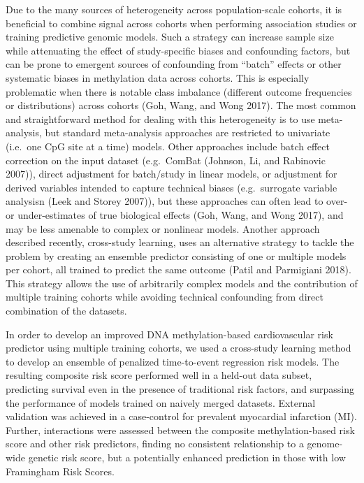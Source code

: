 \documentclass[]{article}
\begin{document}
Due to the many sources of heterogeneity across population-scale
cohorts, it is beneficial to combine signal across cohorts when
performing association studies or training predictive genomic models.
Such a strategy can increase sample size while attenuating the effect of
study-specific biases and confounding factors, but can be prone to
emergent sources of confounding from ``batch'' effects or other
systematic biases in methylation data across cohorts. This is especially
problematic when there is notable class imbalance (different outcome
frequencies or distributions) across cohorts (Goh, Wang, and Wong 2017).
The most common and straightforward method for dealing with this
heterogeneity is to use meta-analysis, but standard meta-analysis
approaches are restricted to univariate (i.e.~one CpG site at a time)
models. Other approaches include batch effect correction on the input
dataset (e.g.~ComBat (Johnson, Li, and Rabinovic 2007)), direct
adjustment for batch/study in linear models, or adjustment for derived
variables intended to capture technical biases (e.g.~surrogate variable
analysisn (Leek and Storey 2007)), but these approaches can often lead
to over- or under-estimates of true biological effects (Goh, Wang, and
Wong 2017), and may be less amenable to complex or nonlinear models.
Another approach described recently, cross-study learning, uses an
alternative strategy to tackle the problem by creating an ensemble
predictor consisting of one or multiple models per cohort, all trained
to predict the same outcome (Patil and Parmigiani 2018). This strategy
allows the use of arbitrarily complex models and the contribution of
multiple training cohorts while avoiding technical confounding from
direct combination of the datasets.

In order to develop an improved DNA methylation-based cardiovascular
risk predictor using multiple training cohorts, we used a cross-study
learning method to develop an ensemble of penalized time-to-event
regression risk models. The resulting composite risk score performed
well in a held-out data subset, predicting survival even in the presence
of traditional risk factors, and surpassing the performance of models
trained on naively merged datasets. External validation was achieved in
a case-control for prevalent myocardial infarction (MI). Further,
interactions were assessed between the composite methylation-based risk
score and other risk predictors, finding no consistent relationship to a
genome-wide genetic risk score, but a potentially enhanced prediction in
those with low Framingham Risk Scores.
\end{document}
